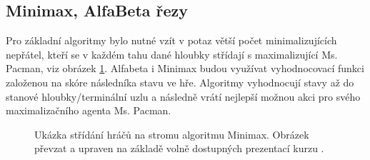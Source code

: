 \subsection*{Minimax, AlfaBeta řezy}
\label{navrh:minabmaxy}
Pro základní algoritmy bylo nutné vzít v potaz větší počet minimalizujících nepřátel, kteří se v každém tahu dané hloubky střídají s maximalizující Ms. Pacman, viz obrázek \ref{img:playersminimax}. Alfabeta i Minimax budou využívat vyhodnocovací funkci založenou na skóre následníka stavu ve hře. Algoritmy vyhodnocují stavy až do stanové hloubky/terminální uzlu a následně vrátí nejlepší možnou akci pro svého maximalizačního agenta Ms. Pacman.

\begin{figure}[!htbp]
\begin{center}
  \caption{Ukázka střídání hráčů na stromu algoritmu Minimax. Obrázek převzat a upraven na základě volně dostupných prezentací kurzu \cite{berkeley}.}
  \label{img:playersminimax}
\end{center}
\end{figure}
\newpage
